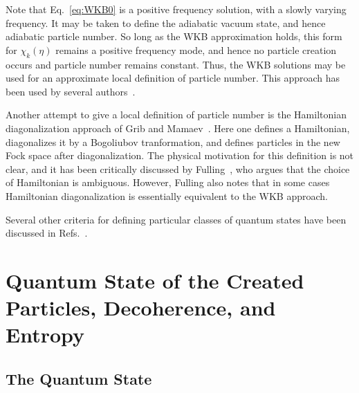 \documentclass[12pt,onecolumn,eqsecnum,floats,aps,prd,floatfix,titlepage,tightenlines]{revtex4-2}
\begin{document}
Note that Eq.~\eqref{eq:WKB0} is a positive frequency solution, with a slowly varying frequency. It may be taken to define the adiabatic vacuum
state, and hence adiabatic particle number. So long as the WKB approximation holds, this form for $\chi_k(\eta)$ remains a positive frequency mode,
and hence no particle creation occurs and particle number remains constant. Thus, the WKB solutions may be used for an approximate local
definition of particle number. This approach has been used by several authors~\cite{Woodhouse76,Berger78,Azuma83,Winitzki05,Parker12,Agullo15}.

Another attempt to give a local definition of particle number is the Hamiltonian diagonalization approach of Grib and Mamaev~\cite{Grib69}. Here one
defines a Hamiltonian, diagonalizes it by a Bogoliubov tranformation, and defines particles in the new Fock space after diagonalization. The physical
motivation for this definition is not clear, and it has been critically discussed by Fulling~\cite{Fulling79}, who argues that the choice of Hamiltonian
is ambiguous. However, Fulling also notes that in some cases Hamiltonian diagonalization is essentially equivalent to the WKB approach. 

Several other criteria for defining particular classes of quantum states have been discussed in Refs.~\cite{Dray83,Degner,AP-Lim03,Raine75}.
 

\section{Quantum State of the Created Particles, Decoherence, and Entropy}
\label{sec:state-entropy}

\subsection{The Quantum State}
\label{sec:state}
\end{document}
